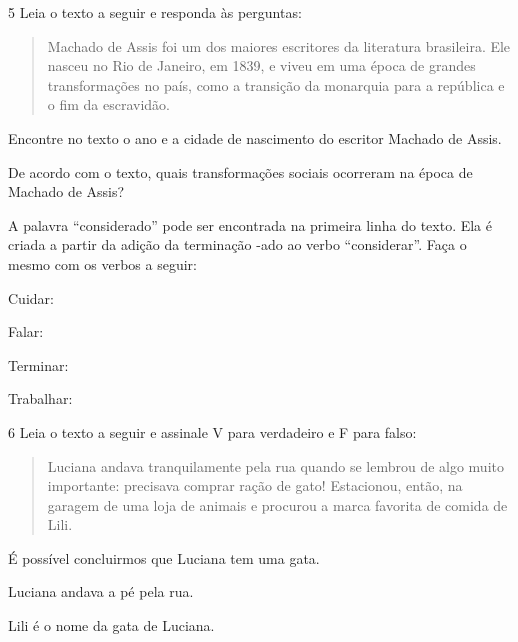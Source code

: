 \num{5} Leia o texto a seguir e responda às perguntas:

\begin{quote}
Machado de Assis foi um dos maiores escritores da literatura
brasileira. Ele nasceu no Rio de Janeiro, em 1839, e viveu em uma época
de grandes transformações no país, como a transição da monarquia para a
república e o fim da escravidão.
\end{quote}

\begin{escolha}
\item Encontre no texto o ano e a cidade de nascimento do escritor Machado de Assis.


\item De acordo com o texto, quais transformações sociais ocorreram na época de Machado de Assis?


\item A palavra ``considerado'' pode ser encontrada na primeira linha do
texto. Ela é criada a partir da adição da terminação -ado ao verbo
``considerar''. Faça o mesmo com os verbos a seguir:

Cuidar: \preencher {}

Falar: \preencher {}

Terminar: \preencher {}

Trabalhar: \preencher {}
\end{escolha}

\num{6} Leia o texto a seguir e assinale V para verdadeiro e F para falso:

\begin{quote}
Luciana andava tranquilamente pela rua quando se lembrou de algo muito
importante: precisava comprar ração de gato! Estacionou, então, na
garagem de uma loja de animais e procurou a marca favorita de comida de
Lili.
\end{quote}

\begin{boxlist}
\item É possível concluirmos que Luciana tem uma gata. 

\item Luciana andava a pé pela rua. 

\item Lili é o nome da gata de Luciana. 
\end{boxlist}

